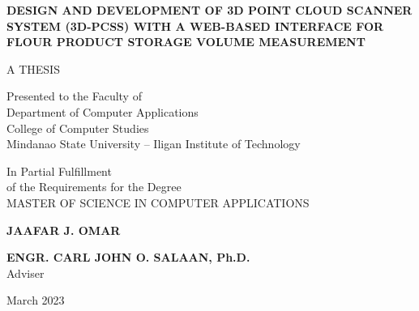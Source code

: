\documentclass[a4paper, 12pt]{report}
\begin{document}
\begin{titlepage}
	\setlength{\topmargin}{-40pt}
	\setlength{\textheight}{664pt}
	\begin{singlespace}
		\begin{center}
			\textbf{\MakeUppercase{Design and Development of 3D Point Cloud Scanner System (3D-PCSS) with A Web-based Interface for Flour Product Storage Volume Measurement}}
			\vspace{2.50cm}

			\MakeUppercase{A THESIS}

			\vspace{2.0cm}

			Presented to the Faculty of\\
			Department of Computer Applications\\
			College of Computer Studies \\
			Mindanao State University -- Iligan Institute of Technology

			\vspace{2.0cm}


			In Partial Fulfillment\\
			of the Requirements for the Degree\\
			MASTER OF SCIENCE IN COMPUTER APPLICATIONS

			\vspace{2.25cm}

			\textbf{JAAFAR J. OMAR}

			\vspace{3.0cm}

			\textbf{ENGR. CARL JOHN O. SALAAN, Ph.D.} \\
			Adviser
			\vspace{2.0cm}

			March 2023

		\end{center}
	\end{singlespace}
\end{titlepage}

\tableofcontents
\listoffigures
\listoftables









\appendix

\end{document}
